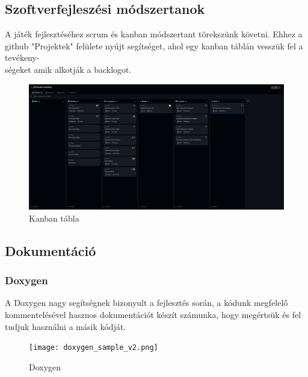\documentclass{scrarticle}
\begin{document}
\subsection{Szoftverfejleszési módszertanok}
A játék fejlesztéséhez scrum és kanban módszertant törekszünk követni. Ehhez a github "Projektek" felülete nyújt segítséget, ahol egy kanban táblán vesszük fel a tevékeny-\\ségeket amik alkotják a backlogot.
\begin{figure}[H]
    \includegraphics[width=1.0\columnwidth]{kanban_scrum.png}
    \caption{Kanban tábla}\label{fig:9}
\end{figure}
\newpage
\subsection{Dokumentáció}
\subsubsection{Doxygen}
A Doxygen nagy segítségnek bizonyult a fejlesztés során, a kódunk megfelelő kommentelésével hasznos dokumentációt készít számunka, hogy megértsük és fel tudjuk használni a másik kódját.
\begin{figure}[H]
    \texttt{[image: doxygen\_sample\_v2.png]}
    \caption{Doxygen}\label{fig:10}
\end{figure}
\end{document}
